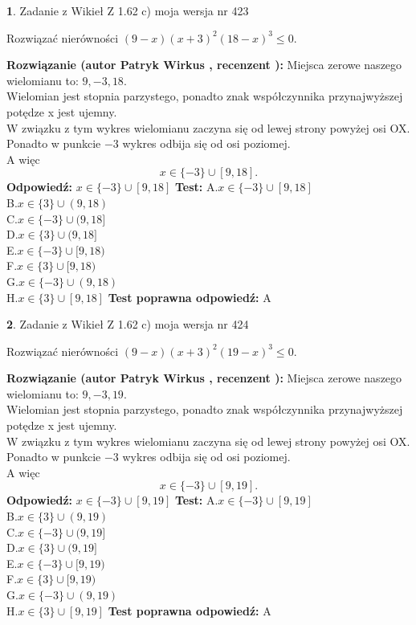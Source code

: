 \documentclass[12pt, a4paper]{article}
\theoremstyle{definition} %
\newtheorem{zad}{}
\newcommand{\zadStart}[1]{\begin{zad}#1\newline}
\newcommand{\zadStop}{\end{zad}}
\newcommand{\rozwStart}[2]{\noindent \textbf{Rozwiązanie (autor #1 , recenzent #2): }\newline}
\newcommand{\rozwStop}{\newline}
\newcommand{\odpStart}{\noindent \textbf{Odpowiedź:}\newline}
\newcommand{\odpStop}{\newline}
\newcommand{\testStart}{\noindent \textbf{Test:}\newline}
\newcommand{\testStop}{\newline}
\newcommand{\kluczStart}{\noindent \textbf{Test poprawna odpowiedź:}\newline}
\newcommand{\kluczStop}{\newline}
\begin{document}
\zadStart{Zadanie z Wikieł Z 1.62 c) moja wersja nr 423}

Rozwiązać nierówności $(9-x)(x+3)^{2}(18-x)^{3}\le0$.
\zadStop
\rozwStart{Patryk Wirkus}{}
Miejsca zerowe naszego wielomianu to: $9, -3, 18$.\\
Wielomian jest stopnia parzystego, ponadto znak współczynnika przy\linebreak najwyższej potędze x jest ujemny.\\ W związku z tym wykres wielomianu zaczyna się od lewej strony powyżej osi OX.\\
Ponadto w punkcie $-3$ wykres odbija się od osi poziomej.\\
A więc $$x \in \{-3\} \cup [9,18].$$
\rozwStop
\odpStart
$x \in \{-3\} \cup [9,18]$
\odpStop
\testStart
A.$x \in \{-3\} \cup [9,18]$\\
B.$x \in \{3\} \cup (9,18)$\\
C.$x \in \{-3\} \cup (9,18]$\\
D.$x \in \{3\} \cup (9,18]$\\
E.$x \in \{-3\} \cup [9,18)$\\
F.$x \in \{3\} \cup [9,18)$\\
G.$x \in \{-3\} \cup (9,18)$\\
H.$x \in \{3\} \cup [9,18]$
\testStop
\kluczStart
A
\kluczStop



\zadStart{Zadanie z Wikieł Z 1.62 c) moja wersja nr 424}

Rozwiązać nierówności $(9-x)(x+3)^{2}(19-x)^{3}\le0$.
\zadStop
\rozwStart{Patryk Wirkus}{}
Miejsca zerowe naszego wielomianu to: $9, -3, 19$.\\
Wielomian jest stopnia parzystego, ponadto znak współczynnika przy\linebreak najwyższej potędze x jest ujemny.\\ W związku z tym wykres wielomianu zaczyna się od lewej strony powyżej osi OX.\\
Ponadto w punkcie $-3$ wykres odbija się od osi poziomej.\\
A więc $$x \in \{-3\} \cup [9,19].$$
\rozwStop
\odpStart
$x \in \{-3\} \cup [9,19]$
\odpStop
\testStart
A.$x \in \{-3\} \cup [9,19]$\\
B.$x \in \{3\} \cup (9,19)$\\
C.$x \in \{-3\} \cup (9,19]$\\
D.$x \in \{3\} \cup (9,19]$\\
E.$x \in \{-3\} \cup [9,19)$\\
F.$x \in \{3\} \cup [9,19)$\\
G.$x \in \{-3\} \cup (9,19)$\\
H.$x \in \{3\} \cup [9,19]$
\testStop
\kluczStart
A
\kluczStop
\end{document}
